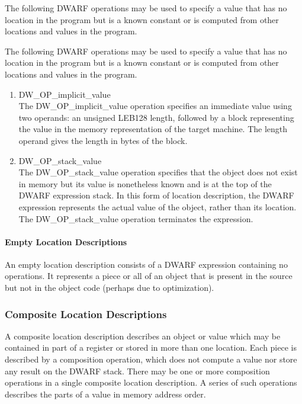 The following DWARF operations may be used to specify a value
that has no location in the program but is a known constant
or is computed from other locations and values in the program.

The following DWARF operations may be used to specify a value
that has no location in the program but is a known constant
or is computed from other locations and values in the program.

\begin{enumerate}[1]
\item DW\-\_OP\-\_implicit\-\_value \\
The DW\-\_OP\-\_implicit\-\_value operation specifies an immediate value
using two operands: an unsigned LEB128 length, followed by
a block representing the value in the memory representation
of the target machine. The length operand gives the length
in bytes of the block.

\item DW\-\_OP\-\_stack\-\_value \\
The DW\-\_OP\-\_stack\-\_value operation specifies that the object
does not exist in memory but its value is nonetheless known
and is at the top of the DWARF expression stack. In this form
of location description, the DWARF expression represents the
actual value of the object, rather than its location. The
DW\-\_OP\-\_stack\-\_value operation terminates the expression.
\end{enumerate}


\paragraph{Empty Location Descriptions}

An empty location description consists of a DWARF expression
containing no operations. It represents a piece or all of an
object that is present in the source but not in the object code
(perhaps due to optimization).

\subsubsection{Composite Location Descriptions}
A composite location description describes an object or
value which may be contained in part of a register or stored
in more than one location. Each piece is described by a
composition operation, which does not compute a value nor
store any result on the DWARF stack. There may be one or
more composition operations in a single composite location
description. A series of such operations describes the parts
of a value in memory address order.

